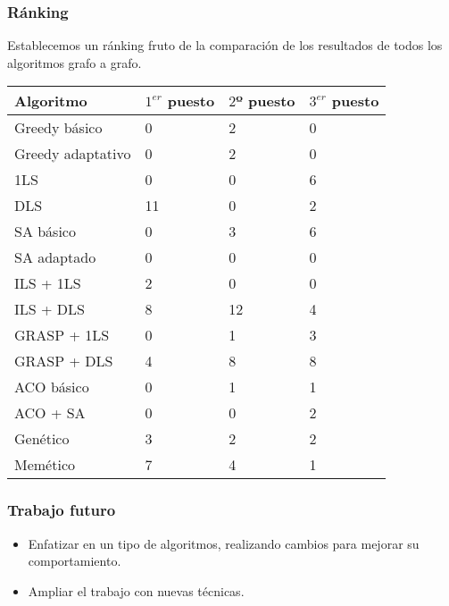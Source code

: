 \documentclass{beamer}
\theoremstyle{theorem}
\begin{document}
\begin{frame}
\frametitle{Ránking}

Establecemos un ránking fruto de la comparación de los resultados de todos los algoritmos grafo a grafo.

  \tiny
  \begin{table}
  \begin{tabular}{l l l l}
    \textbf{Algoritmo} & \textbf{$1^{er}$ puesto} & \textbf{$2$º puesto} & \textbf{$3^{er}$ puesto} \\ \hline
    Greedy básico          &  0  &  2  &  0  \\ \hline
    Greedy adaptativo      &  0  &  2  &  0  \\ \hline
    1LS                    &  0  &  0  &  6  \\ \hline
    DLS                    &  11  &  0  &  2  \\ \hline
    SA básico              &  0  &  3  &  6  \\ \hline
    SA adaptado            &  0  &  0  &  0  \\ \hline
    ILS + 1LS              &  2  &  0  &  0  \\ \hline
    ILS + DLS              &  8  &  12  &  4  \\ \hline
    GRASP + 1LS            &  0  &  1  &  3  \\ \hline
    GRASP + DLS            &  4  &  8  &  8  \\ \hline
    ACO básico             &  0  &  1  &  1  \\ \hline
    ACO + SA               &  0  &  0  &  2  \\ \hline
    Genético               &  3  &  2  &  2  \\ \hline
    Memético               &  7  &  4  &  1  \\ \hline
    \end{tabular}
  \end{table}
\end{frame}


\begin{frame}
  \frametitle{Trabajo futuro}

  \begin{itemize}
    \item Enfatizar en un tipo de algoritmos, realizando cambios para mejorar su comportamiento.
    \item Ampliar el trabajo con nuevas técnicas.
  \end{itemize}

\end{frame}
\end{document}

